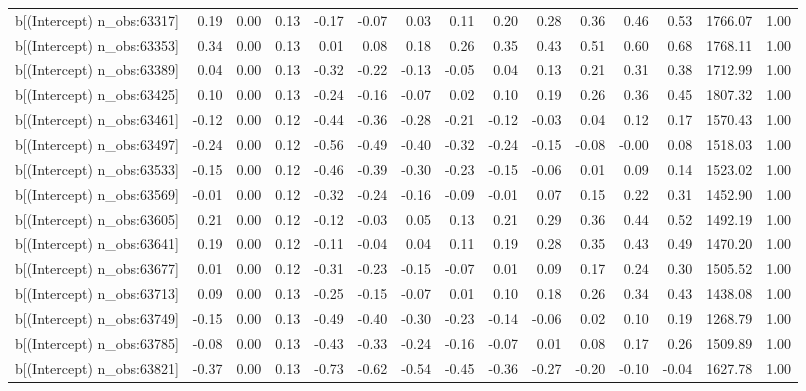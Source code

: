 \begin{table}[ht]
\begin{tabular}{rrrrrrrrrrrrrrr}
  b[(Intercept) n\_obs:63317] & 0.19 & 0.00 & 0.13 & -0.17 & -0.07 & 0.03 & 0.11 & 0.20 & 0.28 & 0.36 & 0.46 & 0.53 & 1766.07 & 1.00 \\ 
  b[(Intercept) n\_obs:63353] & 0.34 & 0.00 & 0.13 & 0.01 & 0.08 & 0.18 & 0.26 & 0.35 & 0.43 & 0.51 & 0.60 & 0.68 & 1768.11 & 1.00 \\ 
  b[(Intercept) n\_obs:63389] & 0.04 & 0.00 & 0.13 & -0.32 & -0.22 & -0.13 & -0.05 & 0.04 & 0.13 & 0.21 & 0.31 & 0.38 & 1712.99 & 1.00 \\ 
  b[(Intercept) n\_obs:63425] & 0.10 & 0.00 & 0.13 & -0.24 & -0.16 & -0.07 & 0.02 & 0.10 & 0.19 & 0.26 & 0.36 & 0.45 & 1807.32 & 1.00 \\ 
  b[(Intercept) n\_obs:63461] & -0.12 & 0.00 & 0.12 & -0.44 & -0.36 & -0.28 & -0.21 & -0.12 & -0.03 & 0.04 & 0.12 & 0.17 & 1570.43 & 1.00 \\ 
  b[(Intercept) n\_obs:63497] & -0.24 & 0.00 & 0.12 & -0.56 & -0.49 & -0.40 & -0.32 & -0.24 & -0.15 & -0.08 & -0.00 & 0.08 & 1518.03 & 1.00 \\ 
  b[(Intercept) n\_obs:63533] & -0.15 & 0.00 & 0.12 & -0.46 & -0.39 & -0.30 & -0.23 & -0.15 & -0.06 & 0.01 & 0.09 & 0.14 & 1523.02 & 1.00 \\ 
  b[(Intercept) n\_obs:63569] & -0.01 & 0.00 & 0.12 & -0.32 & -0.24 & -0.16 & -0.09 & -0.01 & 0.07 & 0.15 & 0.22 & 0.31 & 1452.90 & 1.00 \\ 
  b[(Intercept) n\_obs:63605] & 0.21 & 0.00 & 0.12 & -0.12 & -0.03 & 0.05 & 0.13 & 0.21 & 0.29 & 0.36 & 0.44 & 0.52 & 1492.19 & 1.00 \\ 
  b[(Intercept) n\_obs:63641] & 0.19 & 0.00 & 0.12 & -0.11 & -0.04 & 0.04 & 0.11 & 0.19 & 0.28 & 0.35 & 0.43 & 0.49 & 1470.20 & 1.00 \\ 
  b[(Intercept) n\_obs:63677] & 0.01 & 0.00 & 0.12 & -0.31 & -0.23 & -0.15 & -0.07 & 0.01 & 0.09 & 0.17 & 0.24 & 0.30 & 1505.52 & 1.00 \\ 
  b[(Intercept) n\_obs:63713] & 0.09 & 0.00 & 0.13 & -0.25 & -0.15 & -0.07 & 0.01 & 0.10 & 0.18 & 0.26 & 0.34 & 0.43 & 1438.08 & 1.00 \\ 
  b[(Intercept) n\_obs:63749] & -0.15 & 0.00 & 0.13 & -0.49 & -0.40 & -0.30 & -0.23 & -0.14 & -0.06 & 0.02 & 0.10 & 0.19 & 1268.79 & 1.00 \\ 
  b[(Intercept) n\_obs:63785] & -0.08 & 0.00 & 0.13 & -0.43 & -0.33 & -0.24 & -0.16 & -0.07 & 0.01 & 0.08 & 0.17 & 0.26 & 1509.89 & 1.00 \\ 
  b[(Intercept) n\_obs:63821] & -0.37 & 0.00 & 0.13 & -0.73 & -0.62 & -0.54 & -0.45 & -0.36 & -0.27 & -0.20 & -0.10 & -0.04 & 1627.78 & 1.00 \\ 

\end{tabular}
\end{table}
